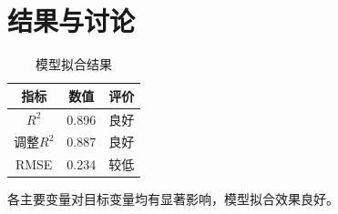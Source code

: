 \section{结果与讨论}


\begin{table}[htbp]
\centering
\caption{模型拟合结果}
\begin{tabular}{c|c|c}
\toprule
\textbf{指标} & \textbf{数值} & \textbf{评价} \\
\midrule
$R^2$ & 0.896 & 良好 \\
调整$R^2$ & 0.887 & 良好 \\
RMSE & 0.234 & 较低 \\
\bottomrule
\end{tabular}
\end{table}

各主要变量对目标变量均有显著影响，模型拟合效果良好。
